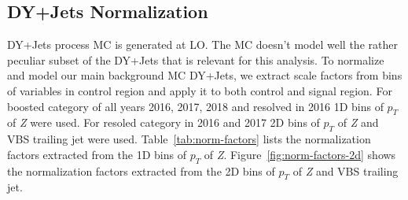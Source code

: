 \subsection{
  DY+Jets Normalization
}

DY+Jets process \gls{MC} is generated at \gls{LO}.
The \gls{MC} doesn't model well the rather peculiar subset of the DY+Jets that is relevant for this analysis.
To normalize and model our main background \gls{MC} DY+Jets,
we extract scale factors from bins of variables
in control region and apply it to both control and signal region.
For boosted category of all years 2016, 2017, 2018
and resolved in 2016 1D bins of \( p_T \) of \textit{Z} were used. For
resoled category in 2016 and 2017 2D bins of \( p_T \) of \textit{Z} and VBS trailing
jet were used. Table~\ref{tab:norm-factors} lists the normalization
factors extracted from the 1D bins of \( p_T \) of \textit{Z}.
Figure~\ref{fig:norm-factors-2d} shows the normalization factors extracted
from the 2D bins of \( p_T \) of \textit{Z} and VBS trailing jet.

